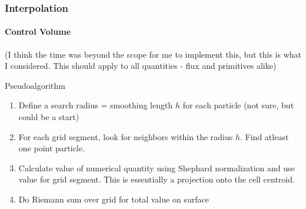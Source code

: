 \documentclass[notheorems, aspectratio=169]{beamer}
\begin{document}
  \begin{frame}
    \frametitle{Interpolation}
    \framesubtitle{Control Volume}

    (I think the time was beyond the scope for me to implement this, but this is what I considered. This should apply to all quantities - flux and primitives alike)
    \begin{block}{Pseudoalgorithm}
      \begin{enumerate}
        \item Define a search radius = smoothing length $h$ for each particle (not sure, but could be a start)
        \item For each grid segment, look for neighbors within the radius $h$. Find atleast one point particle.
        \item Calculate value of numerical quantity using Shephard normalization and use value for grid segment. This is essentially a projection onto the cell centroid.
        \item Do Riemann sum over grid for total value on surface 
      \end{enumerate}
    \end{block}
  

  
  \end{frame}
  
  
\end{document}
